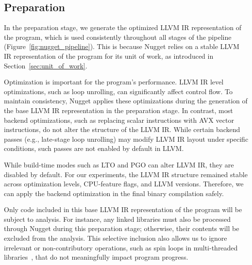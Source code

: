 \subsection{Preparation}\label{sec:initial_setup}

In the preparation stage, we generate the optimized LLVM IR representation of the program, which is used consistently throughout all stages of the pipeline (Figure~\ref{fig:nugget_pipeline}). 
This is because Nugget relies on a stable LLVM IR representation of the program for its unit of work, as introduced in Section~\ref{sec:unit_of_work}.

Optimization is important for the program's performance.
LLVM IR level optimizations, such as loop unrolling, can significantly affect control flow.
To maintain consistency, Nugget applies these optimizations during the generation of the base LLVM IR representation in the preparation stage.
In contrast, most backend optimizations, such as replacing scalar instructions with AVX vector instructions, do not alter the structure of the LLVM IR.
While certain backend passes (e.g., late-stage loop unrolling) may modify LLVM IR layout under specific conditions, such passes are not enabled by default in LLVM.

While build-time modes such as LTO and PGO can alter LLVM IR, they are disabled by default.
For our experiments, the LLVM IR structure remained stable across optimization levels, CPU-feature flags, and LLVM versions.
Therefore, we can apply the backend optimization in the final binary compilation safely.

Only code included in this base LLVM IR representation of the program will be subject to analysis.
For instance, any linked libraries must also be processed through Nugget during this preparation stage; otherwise, their contents will be excluded from the analysis.
This selective inclusion also allows us to ignore irrelevant or non-contributory operations, such as spin loops in multi-threaded libraries~\cite{looppoint}, that do not meaningfully impact program progress.
